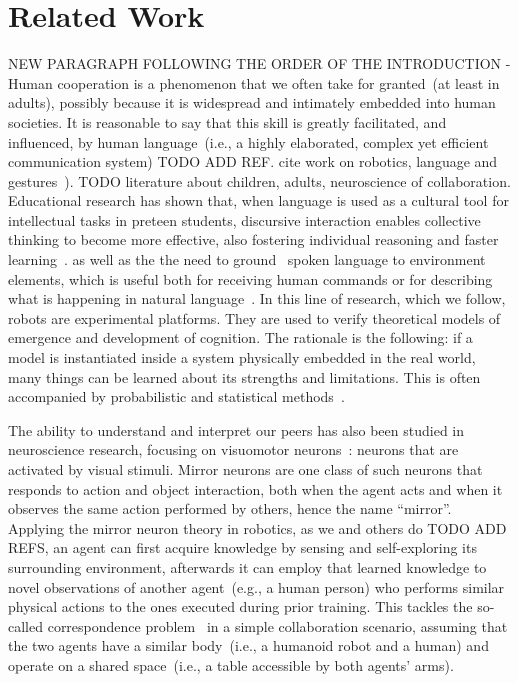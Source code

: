 
\section{Related Work}
\label{sec:related_work}

NEW PARAGRAPH FOLLOWING THE ORDER OF THE INTRODUCTION -
Human cooperation is a phenomenon that we often take for granted~(at least in adults), possibly because it is widespread and intimately embedded into human societies.
It is reasonable to say that this skill is greatly facilitated, and influenced, by human language~(i.e., a highly elaborated, complex yet efficient communication system) TODO ADD REF. cite work on robotics, language and gestures~\cite{matuszek:2014:aaai}).
TODO literature about children, adults, neuroscience of collaboration.
Educational research has shown that, when language is used as a cultural tool for intellectual tasks in preteen students, discursive interaction enables collective thinking to become more effective, also fostering individual reasoning and faster learning~\cite{rojas:2003:ijer}. %
as well as the    the need to ground~\cite{harnad:1990} spoken language to environment elements, which is useful both for receiving human commands or for describing what is happening in natural language~\cite{steels:2003:trendscogsci}.
In this line of research, which we follow, robots are experimental platforms.
They are used to verify theoretical models of emergence and development of cognition.
The rationale is the following: if a model is instantiated inside a system physically embedded in the real world, many things can be learned about its strengths and limitations.
This is often accompanied by probabilistic and statistical methods~\cite{pearl:2014:probabilistic}.

The ability to understand and interpret our peers has also been studied in neuroscience research, focusing on visuomotor neurons~\cite{rizzolatti:2001:nrn}: neurons that are activated by visual stimuli.
Mirror neurons are one class of such neurons that responds to action and object interaction, both when the agent acts and when it observes the same action performed by others, hence the name ``mirror''.
Applying the mirror neuron theory in robotics, as we and others do TODO ADD REFS, an agent can first acquire knowledge by sensing and self-exploring its surrounding environment, %
afterwards it can employ that learned knowledge to novel observations of another agent~(e.g., a human person) who performs similar physical actions to the ones executed during prior training.
This tackles the so-called correspondence problem~\cite{nehaniv:2002:correspondence} in a simple collaboration scenario, assuming that the two agents have a similar body~(i.e., a humanoid robot and a human) and operate on a shared space~(i.e., a table accessible by both agents' arms).

